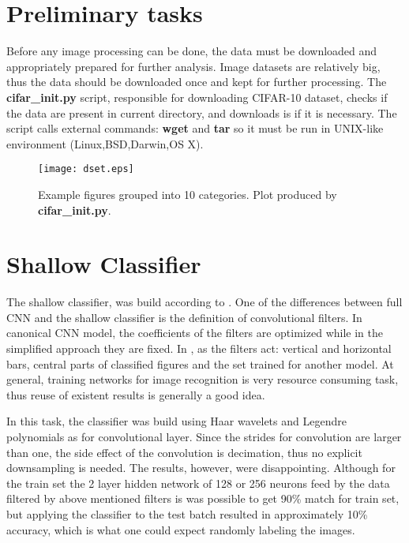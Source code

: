 \documentclass{article}
\begin{document}
\section{Preliminary tasks}

Before any image processing can be done, the data must be downloaded and appropriately prepared
for further analysis. Image datasets are relatively big, thus
the data should be downloaded once and kept for further processing. The {\bf cifar\_init.py}
script, responsible for downloading CIFAR-10 dataset, checks if the data are present in current directory,
and downloads is if it is necessary. The script calls external commands: {\bf wget} and
{\bf tar} so it must be run in UNIX-like environment (Linux,BSD,Darwin,OS X).

\begin{figure}[!hbt]
  \centering
  \texttt{[image: dset.eps]}
  \caption{Example figures grouped into 10 categories. Plot produced by  {\bf cifar\_init.py}.}
\end{figure}


\section{Shallow Classifier \label{sec}}

The shallow classifier, was build according to \cite{shallow}. One of the differences
between full CNN and the shallow classifier is the definition of convolutional
filters. In canonical CNN model, the coefficients of the filters are optimized while
in the simplified approach they are fixed. In \cite{shallow}, as
the filters act: vertical and horizontal bars, central parts of classified
figures and the set trained for another model. At general, training networks
for image recognition is very resource consuming task, thus reuse of existent
results is generally a good idea.

In this task, the classifier was build using Haar wavelets and Legendre polynomials
as for convolutional layer. Since the strides for convolution are larger than one,
the side effect of the convolution is decimation, thus no explicit downsampling is
needed. The results, however, were disappointing. Although for the
train set the 2 layer hidden network of 128 or 256 neurons feed by
the data filtered by above mentioned filters is was possible to get 90\% match for
train set, but applying the classifier to the test batch resulted
in approximately 10\% accuracy, which is
what one could expect randomly labeling the images. 
\end{document}
